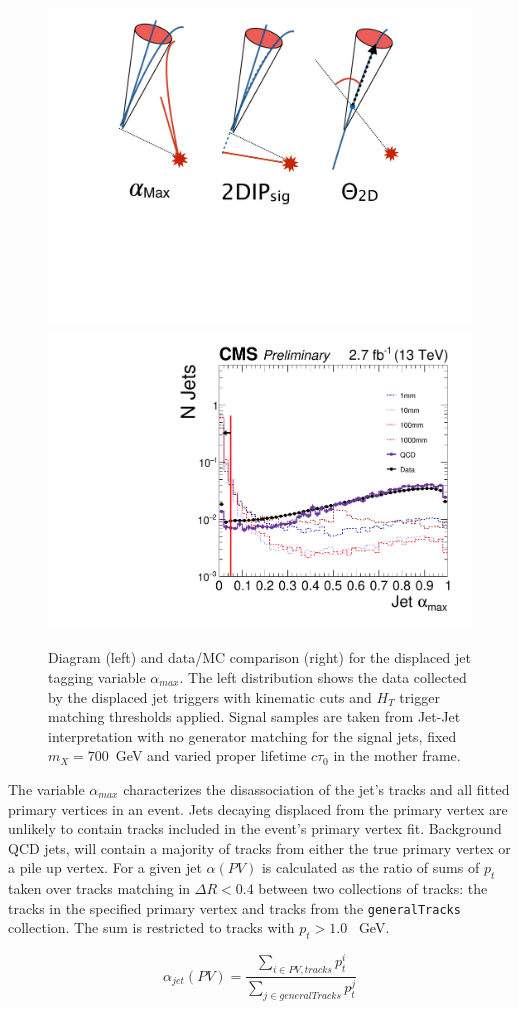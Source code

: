 \begin{figure}
\begin{center}
\includegraphics[width=.20\textwidth]{figures/pas/DIAGRAMS/alpha_diag.pdf}
\includegraphics[width=.5\textwidth]{figures/pas/SELECTION/76x_pu/DJET_alphaMax.pdf}
\caption{Diagram (left) and data/MC comparison (right) for the displaced jet tagging variable $\alpha_{max}$. The left distribution  shows the data collected by the displaced jet triggers with kinematic cuts and $H_T$ trigger matching thresholds applied. Signal samples are taken from Jet-Jet interpretation with no generator matching for the signal jets, fixed $m_X=700$~GeV and varied proper lifetime $c\tau_0$ in the mother frame.  
  \label{fig:alphaMax}}
\end{center}
\end{figure}

The variable $\alpha_{max}$ characterizes the disassociation of the jet's tracks and all fitted primary vertices 
in an event.
Jets decaying displaced from the primary vertex are unlikely to contain tracks 
included in the event's primary vertex fit.
Background QCD jets, will contain a majority of tracks from either the true primary vertex or a pile up vertex.
For a given jet $\alpha(PV)$ is calculated as the ratio of sums of $p_{t}$ taken over tracks matching in $\Delta R< 0.4$ between two
collections of tracks: the tracks in the specified primary vertex and tracks from the \texttt{generalTracks} collection. 
The sum is restricted to tracks with $p_{t}> 1.0$ ~GeV. 

\begin{equation}
\alpha_{jet}(PV) = \frac{\sum_{i\in PV,tracks} p_{t}^i}{ \sum_{j\in generalTracks} p_{t}^j }
\end{equation}

